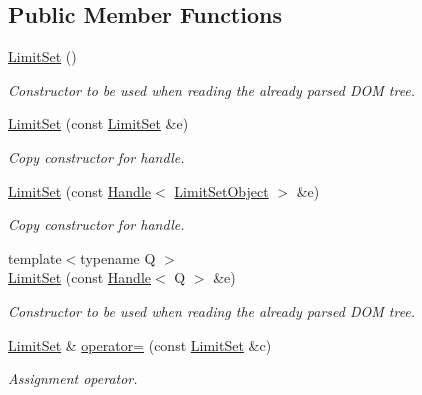 \subsection*{Public Member Functions}
\begin{DoxyCompactItemize}
\item 
\hyperlink{class_d_d4hep_1_1_geometry_1_1_limit_set_a44077ffb973e104ce5175a1695b2d450}{LimitSet} ()
\begin{DoxyCompactList}\small\item\em Constructor to be used when reading the already parsed DOM tree. \item\end{DoxyCompactList}\item 
\hyperlink{class_d_d4hep_1_1_geometry_1_1_limit_set_a886be632405e18f3e90cbb0d886f2975}{LimitSet} (const \hyperlink{class_d_d4hep_1_1_geometry_1_1_limit_set}{LimitSet} \&e)
\begin{DoxyCompactList}\small\item\em Copy constructor for handle. \item\end{DoxyCompactList}\item 
\hyperlink{class_d_d4hep_1_1_geometry_1_1_limit_set_a53b9f8c03c205b3a628c03bf6592689a}{LimitSet} (const \hyperlink{class_d_d4hep_1_1_handle}{Handle}$<$ \hyperlink{class_d_d4hep_1_1_geometry_1_1_limit_set_object}{LimitSetObject} $>$ \&e)
\begin{DoxyCompactList}\small\item\em Copy constructor for handle. \item\end{DoxyCompactList}\item 
{\footnotesize template$<$typename Q $>$ }\\\hyperlink{class_d_d4hep_1_1_geometry_1_1_limit_set_ab8897a481b04196ff0f1d188b7f2fcf2}{LimitSet} (const \hyperlink{class_d_d4hep_1_1_handle}{Handle}$<$ Q $>$ \&e)
\begin{DoxyCompactList}\small\item\em Constructor to be used when reading the already parsed DOM tree. \item\end{DoxyCompactList}\item 
\hyperlink{class_d_d4hep_1_1_geometry_1_1_limit_set}{LimitSet} \& \hyperlink{class_d_d4hep_1_1_geometry_1_1_limit_set_a6590b625e57c2c92da40c8cf0528d45f}{operator=} (const \hyperlink{class_d_d4hep_1_1_geometry_1_1_limit_set}{LimitSet} \&c)
\begin{DoxyCompactList}\small\item\em Assignment operator. \item\end{DoxyCompactList}\item 

\end{DoxyCompactItemize}
